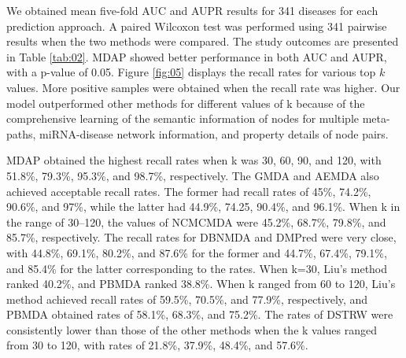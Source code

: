 \documentclass[journal,twoside,web]{ieeecolor}
\begin{document}
We obtained mean five-fold AUC and AUPR results for 341 diseases for each prediction approach. A paired Wilcoxon test was performed using 341 pairwise results when the two methods were compared. The study outcomes are presented in Table \ref{tab:02}. MDAP showed better performance in both AUC and AUPR, with a p-value of 0.05. Figure \ref{fig:05} displays the recall rates for various top $k$ values. More positive samples were obtained when the recall rate was higher. Our model outperformed other methods for different values of k because of the comprehensive learning of the semantic information of nodes for multiple meta-paths, miRNA-disease network information, and property details of node pairs.

MDAP obtained the highest recall rates when k was 30, 60, 90, and 120, with 51.8\%, 79.3\%, 95.3\%, and 98.7\%, respectively. The GMDA and AEMDA also achieved acceptable recall rates. The former had recall rates of 45\%, 74.2\%, 90.6\%, and 97\%, while the latter had 44.9\%, 74.25, 90.4\%, and 96.1\%. When k in the range of 30–120, the values of NCMCMDA were 45.2\%, 68.7\%, 79.8\%, and 85.7\%, respectively. The recall rates for DBNMDA and DMPred were very close, with 44.8\%, 69.1\%, 80.2\%, and 87.6\% for the former and 44.7\%, 67.4\%, 79.1\%, and 85.4\% for the latter corresponding to the rates. When k=30, Liu’s method ranked 40.2\%, and PBMDA ranked 38.8\%. When k ranged from 60 to 120, Liu’s method achieved recall rates of 59.5\%, 70.5\%, and 77.9\%, respectively, and PBMDA obtained rates of 58.1\%, 68.3\%, and 75.2\%. The rates of DSTRW were consistently lower than those of the other methods when the k values ranged from 30 to 120, with rates of 21.8\%, 37.9\%, 48.4\%, and 57.6\%.
\end{document}
